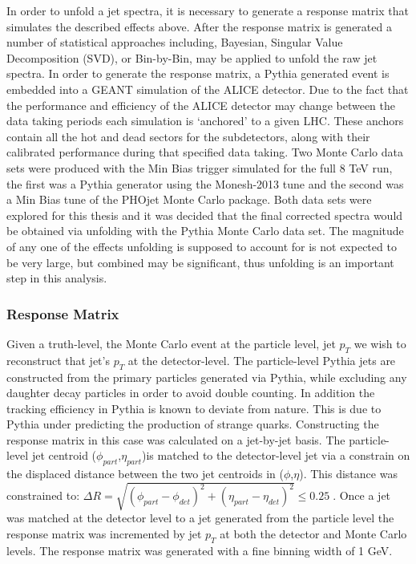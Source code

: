 In order to unfold a jet spectra, it is necessary to generate a response matrix that simulates the described effects above.  After the response matrix is generated a number of statistical approaches including, Bayesian, Singular Value Decomposition (SVD), or Bin-by-Bin, may be applied to unfold the raw jet spectra.  In order to generate the response matrix, a Pythia generated event is embedded into a GEANT simulation of the ALICE detector.  Due to the fact that the performance and efficiency of the ALICE detector may change between the data taking periods each simulation is `anchored' to a given LHC.  These anchors contain all the hot and dead sectors for the subdetectors, along with their calibrated performance during that specified data taking.  Two Monte Carlo data sets were produced with the Min Bias trigger simulated for the full 8 TeV run, the first was a Pythia generator using the Monesh-2013 tune and the second was a Min Bias tune of the PHOjet Monte Carlo package.  Both data sets were explored for this thesis and it was decided that the final corrected spectra would be obtained via unfolding with the Pythia Monte Carlo data set.  The magnitude of any one of the effects unfolding is supposed to account for is not expected to be very large, but combined may be significant, thus unfolding is an important step in this analysis.

\subsubsection{Response Matrix}
Given a truth-level, the Monte Carlo event at the particle level, jet $p_{T}$ we wish to reconstruct that jet's $p_{T}$ at the detector-level.  The particle-level Pythia jets are constructed from the primary particles generated via Pythia, while excluding any daughter decay particles in order to avoid double counting.  In addition the tracking efficiency in Pythia is known to deviate from nature.  This is due to Pythia under predicting the production of strange quarks.  
Constructing the response matrix in this case was calculated on a jet-by-jet basis.  The particle-level jet centroid ($\phi_{part}$,$\eta_{part}$)is matched to the detector-level jet via a constrain on the displaced distance between the two jet centroids in ($\phi$,$\eta$).  This distance was constrained to: $\Delta  R = \sqrt{(\phi_{part} - \phi_{det})^{2} + (\eta_{part} - \eta_{det})^{2}} \leq 0.25 \; $.  Once a jet was matched at the detector level to a jet generated from the particle level the response matrix was incremented by jet $p_{T}$ at both the detector and Monte Carlo levels.  The response matrix was generated with a fine binning width of 1 GeV. 

